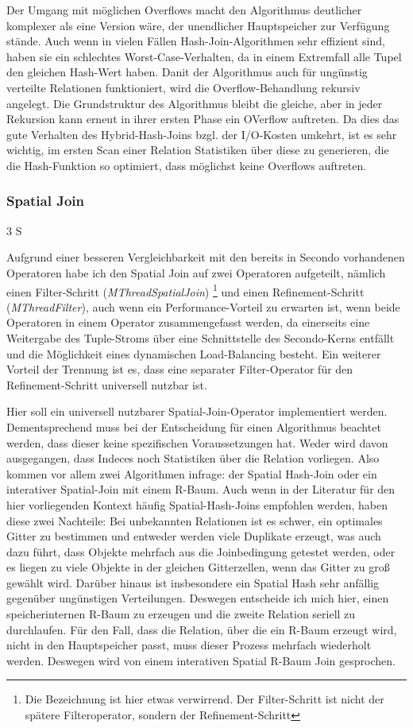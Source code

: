\documentclass[a4paper,12pt,twoside]{article}
\newcommand{\Fb}[1]{\textit{#1}} %
\begin{document}
Der Umgang mit möglichen Overflows macht den Algorithmus deutlicher komplexer als eine Version wäre, der unendlicher Hauptspeicher zur Verfügung stände. Auch wenn in vielen Fällen Hash-Join-Algorithmen sehr effizient sind, haben sie ein schlechtes Worst-Case-Verhalten, da in einem Extremfall alle Tupel den gleichen Hash-Wert haben. Danit der Algorithmus auch für ungünstig verteilte Relationen funktioniert, wird die Overflow-Behandlung rekursiv angelegt. Die Grundstruktur des Algorithmus bleibt die gleiche, aber in jeder Rekursion kann erneut in ihrer ersten Phase ein OVerflow auftreten. Da dies das gute Verhalten des Hybrid-Hash-Joins bzgl. der I/O-Kosten umkehrt, ist es sehr wichtig, im ersten Scan einer Relation Statistiken über diese zu generieren, die die Hash-Funktion so optimiert, dass möglichst keine Overflows auftreten.

\subsubsection{Spatial Join} 3 S

Aufgrund einer besseren Vergleichbarkeit mit den bereits in Secondo vorhandenen Operatoren habe ich den Spatial Join auf zwei Operatoren aufgeteilt, nämlich einen Filter-Schritt (\Fb{MThreadSpatialJoin}) \footnote{Die Bezeichnung ist hier etwas verwirrend. Der Filter-Schritt ist nicht der spätere Filteroperator, sondern der Refinement-Schritt} und einen Refinement-Schritt (\Fb{MThreadFilter}), auch wenn ein Performance-Vorteil zu erwarten ist, wenn beide Operatoren in einem Operator zusammengefasst werden, da einerseits eine Weitergabe des Tuple-Stroms über eine Schnittstelle des Secondo-Kerns entfällt und die Möglichkeit eines dynamischen Load-Balancing besteht. Ein weiterer Vorteil der Trennung ist es, dass eine separater Filter-Operator für den Refinement-Schritt universell nutzbar ist.

Hier soll ein universell nutzbarer Spatial-Join-Operator implementiert werden. Dementsprechend muss bei der Entscheidung für einen Algorithmus beachtet werden, dass dieser keine spezifischen Voraussetzungen hat. Weder wird davon ausgegangen, dass Indeces noch Statistiken über die Relation vorliegen. Also kommen vor allem zwei Algorithmen infrage: der Spatial Hash-Join oder ein interativer Spatial-Join mit einem R-Baum. Auch wenn in der Literatur für den hier vorliegenden Kontext häufig Spatial-Hash-Joins empfohlen werden, haben diese zwei Nachteile: Bei unbekannten Relationen ist es schwer, ein optimales Gitter zu bestimmen und entweder werden viele Duplikate erzeugt, was auch dazu führt, dass Objekte mehrfach aus die Joinbedingung getestet werden, oder es liegen zu viele Objekte in der gleichen Gitterzellen, wenn das Gitter zu groß gewählt wird. Darüber hinaus ist insbesondere ein Spatial Hash sehr anfällig gegenüber ungünstigen Verteilungen. Deswegen entscheide ich mich hier, einen speicherinternen R-Baum zu erzeugen und die zweite Relation seriell zu durchlaufen. Für den Fall, dass die Relation, über die ein R-Baum erzeugt wird, nicht in den Hauptspeicher passt, muss dieser Prozess mehrfach wiederholt werden. Deswegen wird von einem interativen Spatial R-Baum Join gesprochen.
\end{document}
